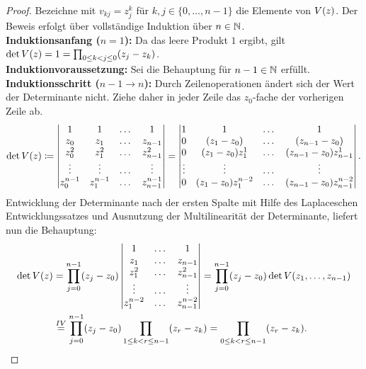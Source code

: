 \begin{proof}
    Bezeichne mit $v_{kj} = z_j^k$ für $k,j \in \{0, \dots, n-1\}$ die Elemente von $\text{$V(z)$}$.
    Der Beweis erfolgt über vollständige Induktion über $n \in \mathbb{N}$.\\
    \textbf{Induktionsanfang ($n=1$):}
    Da das leere Produkt $1$ ergibt, gilt
    $\det{\text{$V(z)$}} = 1 = \prod_{0 \leq k < j \leq 0} (z_j - z_k)$. \\[0.5em]
    \textbf{Induktionvoraussetzung:}
    Sei die Behauptung für $n-1 \in \mathbb{N}$ erfüllt.\\[0.5em]
    \textbf{Induktionsschritt ($n-1 \rightarrow n$):}
    Durch Zeilenoperationen ändert sich der Wert der Determinante nicht.
    Ziehe daher in jeder Zeile das $z_0$-fache der vorherigen Zeile ab.
    \[
        \det{\text{$V(z)$}}
        \coloneqq \begin{vmatrix}
            1         & 1         & \dots & 1 \\
            z_0       & z_1       & \dots & z_{n-1} \\
            z_0^2     & z_1^2     & \dots & z_{n-1}^2 \\
            \vdots    & \vdots    & \dots & \vdots \\
            z_0^{n-1} & z_1^{n-1} & \dots & z_{n-1}^{n-1}
        \end{vmatrix}
        = \begin{vmatrix}
            1      & 1                  & \dots & 1 \\
            0      & (z_1-z_0)          & \dots & (z_{n-1}-z_0) \\
            0      & (z_1-z_0)z_1^1     & \dots & (z_{n-1}-z_0) z_{n-1}^1 \\
            \vdots & \vdots             & \dots & \vdots \\
            0      & (z_1-z_0)z_1^{n-2} & \dots & (z_{n-1}-z_0) z_{n-1}^{n-2}
        \end{vmatrix}.
    \]
    Entwicklung der Determinante nach der ersten Spalte mit Hilfe des
    Laplaceschen Entwicklungssatzes und Ausnutzung der Multilinearität der
    Determinante, liefert nun die Behauptung:
    \[
        \begin{split}
            \det{\text{$V(z)$}}
            &= \prod_{j=0}^{n-1} (z_j - z_0) \begin{vmatrix}
                1         & \dots & 1 \\
                z_1       & \dots & z_{n-1} \\
                z_1^2     & \dots & z_{n-1}^2 \\
                \vdots    & \dots & \vdots \\
                z_1^{n-2} & \dots & z_{n-1}^{n-2}
            \end{vmatrix}
            = \prod_{j=0}^{n-1} (z_j - z_0) \det{\text{$V(z_1, \dots, z_{n-1})$}}\\
            &\overset{IV}{=} \prod_{j=0}^{n-1} (z_j - z_0) \prod_{1 \leq k < r \leq n-1} (z_r - z_k)
            = \prod_{0 \leq k < r \leq n-1} (z_r - z_k).
        \end{split}
    \]
\end{proof}
